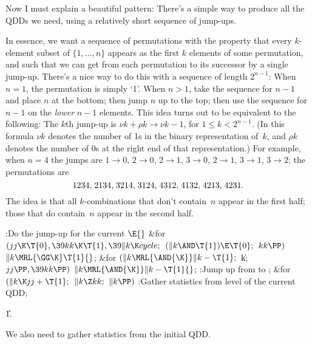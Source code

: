 Now I must explain a beautiful pattern: There's a simple way
to produce
all the QDDs we need, using a relatively short sequence of jump-ups.

In essence, we want a sequence of permutations with the
property that every $k$-element subset of $\{1,\ldots,n\}$ appears
as the first $k$ elements of some permutation, and such that we can
get from each permutation to its successor by a single jump-up.
There's a nice way to do this with a sequence of length $2^{n-1}$:
When $n=1$, the permutation is simply `1'. When $n>1$, take the
sequence for $n-1$ and place $n$ at the bottom; then jump $n$ up
to the top; then use the sequence for $n-1$ on the {\it lower\/}
$n-1$ elements. This idea turns out to be equivalent to the following:
The $k$th jump-up is $\nu k+\rho k\to\nu k-1$, for $1\le k<2^{n-1}$.
(In this formula
$\nu k$ denotes the number of 1s in the binary representation of~$k$,
and $\rho k$ denotes the number of 0s at the right end of that representation.)
For example, when $n=4$ the jumps are $1\to0$, $2\to0$, $2\to1$, $3\to0$,
$2\to1$, $3\to1$, $3\to2$; the permutations are
$$\thinmuskip=\thickmuskip
1234,2134,3214,3124,4312,4132,4213,4231.$$
The idea is that all $k$-combinations that don't contain~$n$ appear
in the first half; those that do contain~$n$ appear in the second half.

\Y\B\4:Do the jump-up for the current \X${}\E{}$\6
\&{for} ${}(\\{jj}\K\T{0},\39\\{kk}\K\T{1},\39\|k\K\\{cycle};{}$ ${}(\|k\AND%
\T{1})\E\T{0};{}$ ${}\\{kk}\PP){}$\1\5
${}\|k\MRL{{\GG}{\K}}\T{1}{}$;\2\6
\&{for} ${}(\|k\MRL{\AND{\K}}\|k-\T{1};{}$ \|k; ${}\\{jj}\PP,\39\\{kk}\PP){}$\1%
\5
${}\|k\MRL{\AND{\K}}\|k-\T{1}{}$;\2\6
:Jump up from  to \X;\6
\&{for} ${}(\|k\K\\{jj}+\T{1};{}$ ${}\|k\Z\\{kk};{}$ ${}\|k\PP){}$\1\5
:Gather statistics from level  of the current QDD\X;\2\par
\U1.\fi

We also need to gather statistics from the initial QDD.


